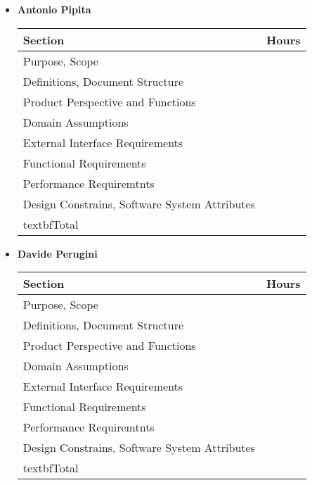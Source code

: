 \begin{itemize}
\item \textbf{Antonio Pipita}

\begin{table}[!h]
\begin{tabular}{|l|l|}
\hline
\textbf{Section}														&		\textbf{Hours}  \\ \hline
Purpose, Scope														&  	\\ \hline
Definitions, Document Structure							&  	\\ \hline
Product Perspective and Functions						&  	\\ \hline
Domain Assumptions												&  	\\ \hline
External Interface Requirements							&  	\\ \hline
Functional Requirements										&  	\\ \hline
Performance Requiremtnts									&  	\\ \hline
Design Constrains, Software System Attributes	&  	\\ \hline
textbf{Total}															&  	\\ \hline
\end{tabular}
\end{table}

\item \textbf{Davide Perugini}

\begin{table}[!h]
\begin{tabular}{|l|l|}
\hline
\textbf{Section}														&		\textbf{Hours}  \\ \hline
Purpose, Scope														&  	\\ \hline
Definitions, Document Structure							&  	\\ \hline
Product Perspective and Functions						&  	\\ \hline
Domain Assumptions												&  	\\ \hline
External Interface Requirements							&  	\\ \hline
Functional Requirements										&  	\\ \hline
Performance Requiremtnts									&  	\\ \hline
Design Constrains, Software System Attributes	&  	\\ \hline
textbf{Total}															&  	\\ \hline
\end{tabular}
\end{table}


\end{itemize}
